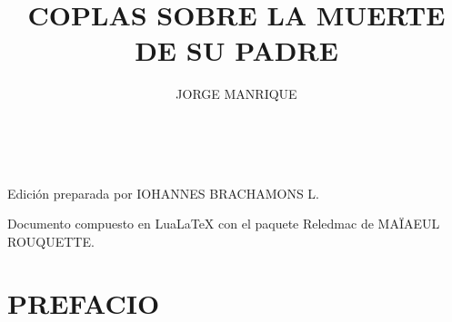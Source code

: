 \documentclass[11pt,a4paper,twoside]{article}
\title{COPLAS SOBRE LA MUERTE DE SU PADRE}
\author{\fontsize{14}{11.96}\selectfont JORGE MANRIQUE}
\date{\vspace{60pt}\fontsize{11}{11}\selectfont{EDICIÓN CRÍTICA LIMINAR}\\\fontsize{40}{11}\selectfont{\vfill\LaTeX}}
\begin{document}
	{
	\maketitle
}
	\newpage
%
\hskip0pt
\vfill
\begin{flushright}
	Edición preparada por {\fontsize{9}{1}\selectfont IOHANNES BRACHAMONS L}.
\end{flushright}

\begin{flushright}
	Documento compuesto en LuaLaTeX con el paquete Reledmac de {\fontsize{9}{11}\selectfont MAÏAEUL ROUQUETTE}.
\end{flushright}
\newpage
%
\tableofcontents
\newpage
%
\setcounter{page}{1}
\section*{\fontsize{11}{14}\selectfont PREFACIO}
\end{document}
